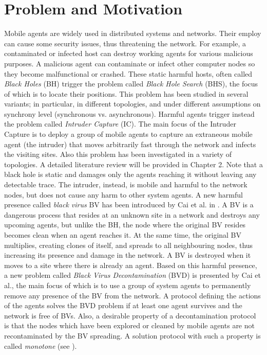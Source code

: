 \section{Problem and Motivation} 
Mobile agents are widely used in distributed systems and networks. Their employ can cause some security issues, thus threatening   the network. For example, a contaminated or infected host can destroy working agents for various malicious purposes. A malicious agent can contaminate or infect other computer nodes so they become malfunctional or crashed.
  These static  harmful hosts, often called {\em Black Holes} (BH) trigger the problem called {\em Black Hole Search} (BHS), the focus of which is to locate their positions. This problem has been studied in several variants; in particular, in   different topologies, and under different assumptions on synchrony level   (synchronous vs. asynchronous). 
  Harmful agents trigger instead the problem called {\em Intruder Capture} (IC). The main focus of the Intruder Capture  is to deploy a group of mobile agents to capture an extraneous mobile agent (the intruder) that moves arbitrarily fast through the network and infects the visiting sites. Also this problem  has been investigated in a variety of topologies. A  detailed literature review will be provided in Chapter 2. Note that a black hole is static and   damages only  the agents reaching it without leaving any detectable trace. The intruder, instead,  is mobile and harmful to the network nodes, but does not cause any harm to other system agents. 
    A new harmful presence called {\em black virus} BV has been   introduced by Cai et al. in \cite{cai}. A BV is a dangerous process that resides at an unknown site in a network and destroys any upcoming agents, but unlike the BH, the node where the original BV resides   becomes clean when an agent reaches it. At the same time, the original BV multiplies, creating clones of itself, and spreads to all neighbouring nodes, thus increasing its presence and damage  in the network. A BV is destroyed when it moves to a site where there is already an agent. Based on this harmful presence, a new problem called {\em Black Virus Decontamination} (BVD) is presented by Cai et al., the main focus of which is to use a group of system agents to permanently remove any presence of the BV from the network. A protocol defining the actions of the agents solves the BVD problem if at least one agent survives and the network is free of BVs. Also, a desirable property of a  decontamination protocol is that the nodes which have been explored or cleaned by mobile agents are not   recontaminated by the BV spreading. A solution protocol with such a property is  called {\em monotone} (see \cite{monotone}).
